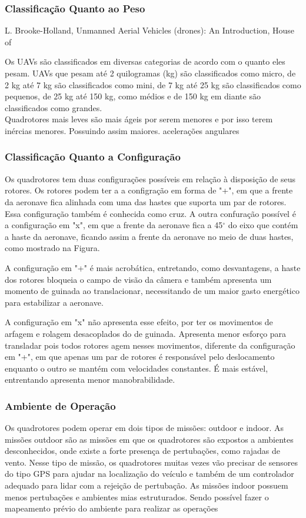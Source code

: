 \subsubsection{Classificação Quanto ao Peso}
L. Brooke-Holland, Unmanned Aerial Vehicles (drones): An Introduction, House of

Os UAVs são classificados em diversas categorias de acordo com o quanto eles pesam. UAVs que pesam até 2 quilogramas (kg) são classificados como micro, de 2 kg até 7 kg são classificados como mini, de 7 kg até 25 kg são classificados como pequenos, de 25 kg até 150 kg, como médios e de 150 kg em diante são classificados como grandes.\\
Quadrotores mais leves são mais ágeis por serem menores e por isso terem inércias menores. Possuindo assim maiores. acelerações angulares 

\subsubsection{Classificação Quanto a Configuração}
Os quadrotores tem duas configurações possíveis em relação à disposição de seus rotores. Os rotores podem ter a a configração em forma de "+", em que a frente da aeronave fica alinhada com uma das hastes que suporta um par de rotores. Essa configuração também é conhecida como cruz. A outra confuração possível é a configuração em "x", em que a frente da aeronave fica a 45$^{\circ}$ do eixo que contém a haste da aeronave, ficando assim a frente da aeronave no meio de duas hastes, como mostrado na Figura.

A configuração em "+" é mais acrobática, entretando, como desvantagens, a haste dos rotores bloqueia o campo de visão da câmera e também apresenta um momento de guinada ao translacionar, necessitando de um maior gasto energético para estabilizar a aeronave.

A configuração em "x" não apresenta esse efeito, por ter os movimentos de arfagem e rolagem desacoplados do de guinada. Apresenta menor esforço para transladar pois todos rotores agem nesses movimentos, diferente da configuração em "+", em que apenas um par de rotores é responsável pelo deslocamento enquanto o outro se mantém com velocidades constantes. É mais estável, entrentando apresenta menor manobrabilidade.

\subsubsection{Ambiente de Operação}
Os quadrotores podem operar em dois tipos de missões: outdoor e indoor. As missões outdoor são as missões em que os quadrotores são expostos a ambientes desconhecidos, onde existe a forte presença de pertubações, como rajadas de vento. Nesse tipo de missão, os quadrotores muitas vezes vão precisar de sensores do tipo GPS para ajudar na localização do veículo e também de um controlador adequado para lidar com a rejeição de pertubação. As missões indoor possuem menos pertubações e ambientes mias estruturados. Sendo possível fazer o mapeamento prévio do ambiente para realizar as operações 


